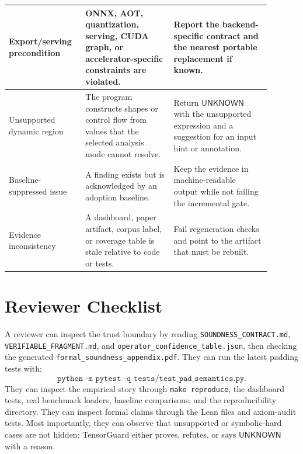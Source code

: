 \documentclass[11pt]{article}
\newcommand{\tg}{TensorGuard}
\newcommand{\unknown}{\ensuremath{\mathsf{UNKNOWN}}}
\begin{document}
\begin{longtable}{|p{0.24\linewidth}|p{0.31\linewidth}|p{0.34\linewidth}|}
Export/serving precondition & ONNX, AOT, quantization, serving, CUDA graph, or accelerator-specific
constraints are violated. & Report the backend-specific contract and the nearest
portable replacement if known. \\
\hline
Unsupported dynamic region & The program constructs shapes or control flow from
values that the selected analysis mode cannot resolve. & Return \unknown{} with
the unsupported expression and a suggestion for an input hint or annotation. \\
\hline
Baseline-suppressed issue & A finding exists but is acknowledged by an adoption
baseline. & Keep the evidence in machine-readable output while not failing the
incremental gate. \\
\hline
Evidence inconsistency & A dashboard, paper artifact, corpus label, or coverage
table is stale relative to code or tests. & Fail regeneration checks and point
to the artifact that must be rebuilt. \\
\hline
\end{longtable}

\section{Reviewer Checklist}

A reviewer can inspect the trust boundary by reading
\texttt{SOUNDNESS\_CONTRACT.md}, \texttt{VERIFIABLE\_FRAGMENT.md}, and
\texttt{operator\_confidence\_table.json}, then checking the generated
\texttt{formal\_soundness\_appendix.pdf}.  They can run the latest padding
tests with:
\[
\texttt{python -m pytest -q tests/test\_pad\_semantics.py}.
\]
They can inspect the empirical story through \texttt{make reproduce}, the
dashboard tests, real benchmark loaders, baseline comparisons, and the
reproducibility directory.  They can inspect formal claims through the Lean
files and axiom-audit tests.  Most importantly, they can observe that unsupported
or symbolic-hard cases are not hidden: \tg{} either proves, refutes, or says
\unknown{} with a reason.
\end{document}
